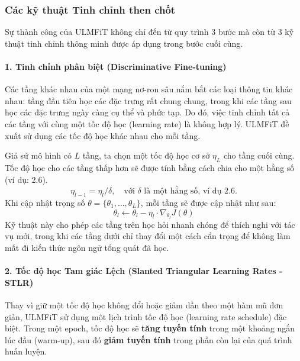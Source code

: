 \subsubsection{Các kỹ thuật Tinh chỉnh then chốt}
Sự thành công của ULMFiT không chỉ đến từ quy trình 3 bước mà còn từ 3 kỹ thuật tinh chỉnh thông minh được áp dụng trong bước cuối cùng.

\paragraph{1. Tinh chỉnh phân biệt (Discriminative Fine-tuning)}
Các tầng khác nhau của một mạng nơ-ron sâu nắm bắt các loại thông tin khác nhau: tầng đầu tiên học các đặc trưng rất chung chung, trong khi các tầng sau học các đặc trưng ngày càng cụ thể và phức tạp. Do đó, việc tinh chỉnh tất cả các tầng với cùng một tốc độ học (learning rate) là không hợp lý. ULMFiT đề xuất sử dụng các tốc độ học khác nhau cho mỗi tầng.

Giả sử mô hình có $L$ tầng, ta chọn một tốc độ học cơ sở $\eta_L$ cho tầng cuối cùng. Tốc độ học cho các tầng thấp hơn sẽ được tính bằng cách chia cho một hằng số (ví dụ: 2.6).
\[
\eta_{l-1} = \eta_l / \delta, \quad \text{với } \delta \text{ là một hằng số, ví dụ } 2.6.
\]
Khi cập nhật trọng số $\theta = \{\theta_1, \dots, \theta_L\}$, mỗi tầng sẽ được cập nhật như sau:
\begin{equation}
    \theta_l \leftarrow \theta_l - \eta_l \cdot \nabla_{\theta_l} J(\theta)
    \label{eq:discriminative_finetuning}
\end{equation}
Kỹ thuật này cho phép các tầng trên học hỏi nhanh chóng để thích nghi với tác vụ mới, trong khi các tầng dưới chỉ thay đổi một cách cẩn trọng để không làm mất đi kiến thức ngôn ngữ tổng quát đã học.

\paragraph{2. Tốc độ học Tam giác Lệch (Slanted Triangular Learning Rates - STLR)}
Thay vì giữ một tốc độ học không đổi hoặc giảm dần theo một hàm mũ đơn giản, ULMFiT sử dụng một lịch trình tốc độ học (learning rate schedule) đặc biệt. Trong một epoch, tốc độ học sẽ \textbf{tăng tuyến tính} trong một khoảng ngắn lúc đầu (warm-up), sau đó \textbf{giảm tuyến tính} trong phần còn lại của quá trình huấn luyện.


